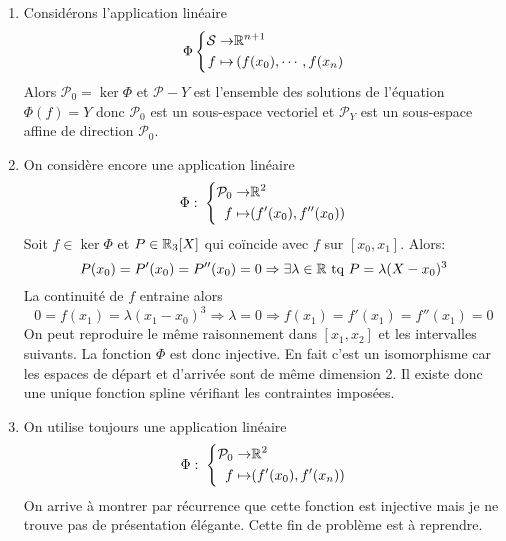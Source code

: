 \begin{enumerate}
  \item Considérons l'application linéaire
\begin{displaymath}
 \Phi \left\lbrace 
\begin{aligned}
  \mathcal{S} \rightarrow& \mathbb{R}^{n+1} \\ f \mapsto& \left( f(x_0), \cdots, f(x_n\right) 
\end{aligned}
\right. 
\end{displaymath}
Alors $\mathcal{P}_0 = \ker \Phi$ et $\mathcal{P}-Y$ est l'ensemble des solutions de l'équation $\Phi(f)=Y$ donc $\mathcal{P}_0$ est un sous-espace vectoriel et $\mathcal{P}_Y$ est un sous-espace affine de direction $\mathcal{P}_0$.

  \item On considère encore une application linéaire
\begin{displaymath}
  \Phi:\;
\left\lbrace 
\begin{aligned}
  \mathcal{P}_0 \rightarrow& \mathbb{R}^2 \\ f \mapsto& (f'(x_0), f''(x_0))
\end{aligned}
\right. 
\end{displaymath}
Soit $f\in \ker \Phi$ et $P\in \mathbb{R}_3[X]$ qui coïncide avec $f$ sur $[x_0,x_1]$. Alors:
\begin{displaymath}
  P(x_0)=P'(x_0)=P''(x_0)=0 \Rightarrow \exists \lambda\in \mathbb{R} \text{ tq } P = \lambda(X-x_0)^3
\end{displaymath}
La continuité de $f$ entraine alors 
\begin{displaymath}
  0=f(x_1)=\lambda (x_1-x_0)^3 \Rightarrow \lambda = 0 \Rightarrow f(x_1) = f'(x_1) = f''(x_1) = 0
\end{displaymath}
On peut reproduire le même raisonnement dans $[x_1,x_2]$ et les intervalles suivants. La fonction $\Phi$ est donc injective. En fait c'est un isomorphisme car les espaces de départ et d'arrivée sont de même dimension 2. Il existe donc une unique fonction spline vérifiant les contraintes imposées.
  
  \item On utilise toujours une application linéaire
\begin{displaymath}
  \Phi:\;
\left\lbrace 
\begin{aligned}
  \mathcal{P}_0 \rightarrow& \mathbb{R}^2 \\ f \mapsto& (f'(x_0), f'(x_n))
\end{aligned}
\right. 
\end{displaymath}
On arrive à montrer par récurrence que cette fonction est injective mais je ne trouve pas de présentation élégante. Cette fin de problème est à reprendre.

\end{enumerate}
